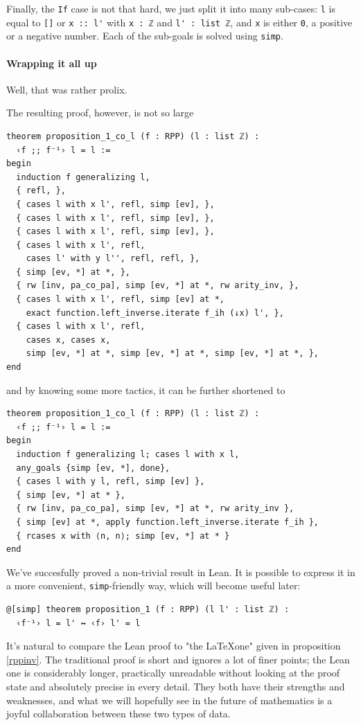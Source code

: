 \documentclass{book}
\theoremstyle{definition}
\theoremstyle{remark}
\theoremstyle{plain}
\begin{document}
Finally, the \lstinline{If} case is not that hard,
we just split it into many sub-cases:
\lstinline{l} is equal to \lstinline{[]} or \lstinline{x :: l'} with \lstinline{x : ℤ} and \lstinline{l' : list ℤ},
and \lstinline{x} is either \lstinline{0}, a positive or a negative number.
Each of the sub-goals is solved using \lstinline{simp}.

\paragraph{Wrapping it all up}
Well, that was rather prolix.

The resulting proof, however, is not so large
\begin{lstlisting}
theorem proposition_1_co_l (f : RPP) (l : list ℤ) :
  ‹f ;; f⁻¹› l = l :=
begin
  induction f generalizing l,
  { refl, },
  { cases l with x l', refl, simp [ev], },
  { cases l with x l', refl, simp [ev], },
  { cases l with x l', refl, simp [ev], },
  { cases l with x l', refl,
    cases l' with y l'', refl, refl, },
  { simp [ev, *] at *, },
  { rw [inv, pa_co_pa], simp [ev, *] at *, rw arity_inv, },
  { cases l with x l', refl, simp [ev] at *,
    exact function.left_inverse.iterate f_ih (↓x) l', },
  { cases l with x l', refl,
    cases x, cases x,
    simp [ev, *] at *, simp [ev, *] at *, simp [ev, *] at *, },
end
\end{lstlisting}
and by knowing some more tactics, it can be further shortened to
\begin{lstlisting}
theorem proposition_1_co_l (f : RPP) (l : list ℤ) :
  ‹f ;; f⁻¹› l = l :=
begin
  induction f generalizing l; cases l with x l,
  any_goals {simp [ev, *], done},
  { cases l with y l, refl, simp [ev] },
  { simp [ev, *] at * },
  { rw [inv, pa_co_pa], simp [ev, *] at *, rw arity_inv },
  { simp [ev] at *, apply function.left_inverse.iterate f_ih },
  { rcases x with ⟨n, n⟩; simp [ev, *] at * }
end
\end{lstlisting}
We've succesfully proved a non-trivial result in Lean.
It is possible to express it in a more convenient, \lstinline{simp}-friendly way, which will become useful later:
\begin{lstlisting}
@[simp] theorem proposition_1 (f : RPP) (l l' : list ℤ) :
  ‹f⁻¹› l = l' ↔ ‹f› l' = l
\end{lstlisting}

It's natural to compare the Lean proof to "the \LaTeX\space one" given in proposition \ref{rppinv}.
The traditional proof is short and ignores a lot of finer points;
the Lean one is considerably longer,
practically unreadable without looking at the proof state and absolutely precise in every detail.
They both have their strengths and weaknesses,
and what we will hopefully see in the future of mathematics is a joyful collaboration between these two types of data.
\end{document}
